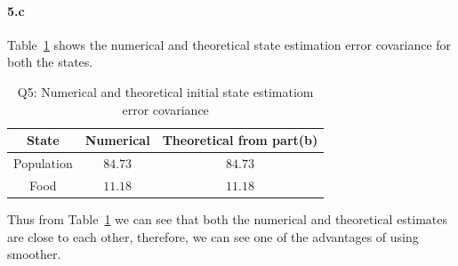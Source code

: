 \paragraph{5.c}Table~\ref{tbl:q5_init_cov} shows the numerical and theoretical state estimation error covariance for both the states.
\begin{table}[ht]
	\centering
	\caption{Q5: Numerical and theoretical initial state estimatiom error covariance}
	\begin{tabular}[t]{ccc} 
		\hline
		State 			& Numerical & Theoretical from part(b)\\ [0.5ex] 
		\hline
		Population 	& $84.73$ 	& $84.73$\\
		Food 	& $11.18$ 	& $11.18$\\[1ex]
		\hline
	\end{tabular}
	\label{tbl:q5_init_cov}
\end{table}
Thus from Table~\ref{tbl:q5_init_cov} we can see that both the numerical and theoretical estimates are close to each other, therefore, we can see one of the advantages of using smoother.
 